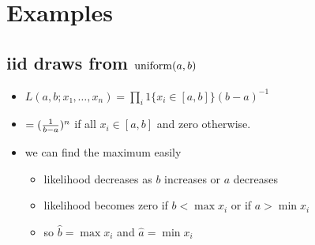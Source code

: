 \section{Examples}

\subsection{iid draws from $\operatorname{uniform}(a,b)$}
\begin{itemize}
\item $L(a,b; x₁,…,x_n) = ∏_i 1\{x_i ∈ [a,b]\} (b-a)^{-1}$
\item $= ({1 \over b-a})^{n}$ if all $x_i ∈ [a,b]$ and zero otherwise.
\item we can find the maximum easily
  \begin{itemize}
  \item likelihood decreases as $b$ increases or $a$ decreases
  \item likelihood becomes zero if $b < \max x_i$ or if $a > \min x_i$
  \item so $\hat b = \max x_i$ and $\hat a = \min x_i$
  \end{itemize}
\end{itemize}

